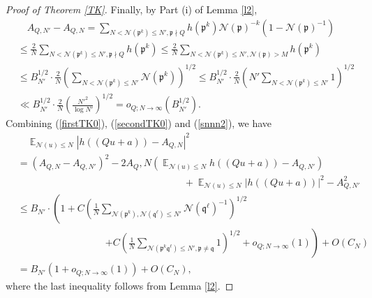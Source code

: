 \documentclass[11pt]{amsart}
\theoremstyle{definition}
\DeclareMathOperator*{\E}{\mathbb{E}}
\newcommand{\NN}{{\mathcal N}}
\newcommand{\mf}{\mathfrak}
\begin{document}
\begin{proof}[Proof of Theorem \ref{TK}]
Finally, by Part (i) of Lemma \ref{l2}, 
\begin{equation}\label{snnn2}
    \begin{split}
        &\quad A_{Q,N'}-A_{Q,N}
        =\sum_{N<\NN(\mf p^{k})\leq N',\mf p\nmid Q}h(\mf p^{k})\NN(\mf p)^{-k}(1-\NN(\mf p)^{-1})
        \\&\leq \frac{2}{N}\sum_{N<\NN(\mf p^{k})\leq N',\mf p\nmid Q}h(\mf p^{k})
        \leq \frac{2}{N}\sum_{N<\NN(\mf p^{k})\leq N',\mf \NN(\mf p)>M}h(\mf p^{k})
        \\&\leq B_{N'}^{1/2}\cdot \frac{2}{N}\left(\sum_{N<\NN(\mf p^{k})\leq N'}\NN(\mf p^{k})\right)^{1/2}
        \leq B_{N'}^{1/2}\cdot \frac{2}{N}\left(N'\sum_{N<\NN(\mf p^{k})\leq N'}1\right)^{1/2}
        \\&\ll B_{N'}^{1/2}\cdot \frac{2}{N}\left(\frac{{N'}^{2}}{\log N'}\right)^{1/2}=o_{Q;N\to\infty}(B_{N'}^{1/2}).
        \end{split}
\end{equation} 
Combining %
(\ref{firstTK0}), (\ref{secondTK0}) and (\ref{snnn2}), we have
%
%
 \begin{equation}\label{snnn}
    \begin{split}
        &\quad \E_{\NN(u) \leq N}\left| h((Qu+a))-A_{Q,N}\right|^{2}  
        \\&=(A_{Q,N}-A_{Q,N'})^{2}-2A_Q,{N}\left(\E_{\NN(u) \leq N}h((Qu+a))-A_{Q,N'}\right)\\&\quad\quad\quad\quad\quad\quad\quad\quad\quad\quad\quad\quad\quad\quad\quad\quad\quad+\E_{\NN(u) \leq N}\vert h((Qu+a))\vert^{2}-A_{Q,N'}^{2}
        \\&\leq B_{N'}\cdot\left(1+C\left(\frac{1}{N}\sum_{\NN(\mf p^{k}),\NN(\mf q^{\ell})\leq N'}\NN(\mf q^{\ell})^{-1}\right)^{1/2}\right.\\&\quad\quad\quad\quad\quad\quad\quad\quad\quad\left.+C\left(\frac{1}{N}\sum_{\NN(\mf p^{k}\mf q^{\ell})\leq N', \mf p\neq \mf q} 1\right)^{1/2}+o_{Q;N\to\infty}(1)\right)+O(C_{N})
        \\&=B_{N'}(%
        1+o_{Q;N\to\infty}(1))+O(C_{N}),
        \end{split}
\end{equation}
where the last inequality follows from %
Lemma \ref{l2}.


\end{proof}
\end{document}
